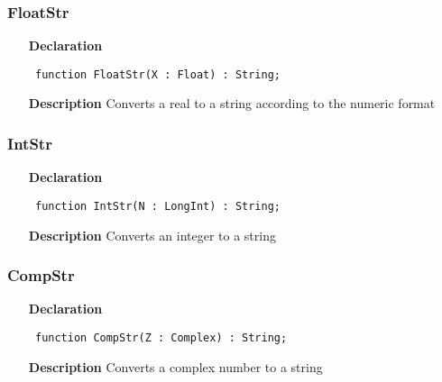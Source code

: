 \documentclass[12pt,a4paper,oneside]{report}
\newcommand{\declarationitem}[1]{\textbf{#1}}
\newcommand{\descriptiontitle}[1]{\textbf{#1}}
\newcommand{\code}[1]{\texttt{#1}}
\begin{document}
\subsubsection{FloatStr}
\label{ustrings-FloatStr}
\begin{itemize}\item[\declarationitem{Declaration}\hfill]
	\begin{flushleft}
		\code{
			function FloatStr(X : Float) : String;}
		
	\end{flushleft}
	
	\par
	\item[\descriptiontitle{Description}]
	Converts a real to a string according to the numeric format
	
\end{itemize}
\subsubsection{IntStr}
\label{ustrings-IntStr}
\begin{itemize}\item[\declarationitem{Declaration}\hfill]
	\begin{flushleft}
		\code{
			function IntStr(N : LongInt) : String;}
		
	\end{flushleft}
	
	\par
	\item[\descriptiontitle{Description}]
	Converts an integer to a string
	
\end{itemize}
\subsubsection{CompStr}
\label{ustrings-CompStr}
\begin{itemize}\item[\declarationitem{Declaration}\hfill]
	\begin{flushleft}
		\code{
			function CompStr(Z : Complex) : String;}
		
	\end{flushleft}
	
	\par
	\item[\descriptiontitle{Description}]
	Converts a complex number to a string
	
\end{itemize}
\end{document}
